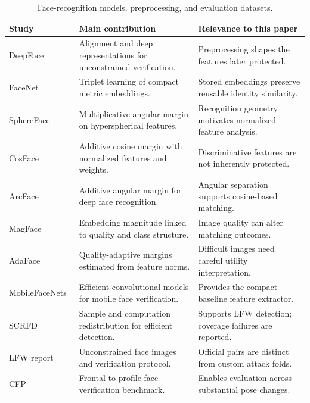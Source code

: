 \begin{table}[t]
\caption{Face-recognition models, preprocessing, and evaluation datasets.}
\label{tab:review1}\centering\footnotesize
\begin{tabularx}{\textwidth}{@{}>{\raggedright\arraybackslash}p{3.1cm}>{\raggedright\arraybackslash}X>{\raggedright\arraybackslash}X@{}}\toprule
Study & Main contribution & Relevance to this paper \\ \midrule
DeepFace~\cite{deepface} & Alignment and deep representations for unconstrained verification. & Preprocessing shapes the features later protected.\\[3pt]
FaceNet~\cite{facenet} & Triplet learning of compact metric embeddings. & Stored embeddings preserve reusable identity similarity.\\[3pt]
SphereFace~\cite{sphereface} & Multiplicative angular margin on hyperspherical features. & Recognition geometry motivates normalized-feature analysis.\\[3pt]
CosFace~\cite{cosface} & Additive cosine margin with normalized features and weights. & Discriminative features are not inherently protected.\\[3pt]
ArcFace~\cite{arcface} & Additive angular margin for deep face recognition. & Angular separation supports cosine-based matching.\\[3pt]
MagFace~\cite{magface} & Embedding magnitude linked to quality and class structure. & Image quality can alter matching outcomes.\\[3pt]
AdaFace~\cite{adaface} & Quality-adaptive margins estimated from feature norms. & Difficult images need careful utility interpretation.\\[3pt]
MobileFaceNets~\cite{chen2018mobilefacenet} & Efficient convolutional models for mobile face verification. & Provides the compact baseline feature extractor.\\[3pt]
SCRFD~\cite{guo2021scrfd} & Sample and computation redistribution for efficient detection. & Supports LFW detection; coverage failures are reported.\\[3pt]
LFW report~\cite{huang2007lfw} & Unconstrained face images and verification protocol. & Official pairs are distinct from custom attack folds.\\[3pt]
CFP~\cite{sengupta2016cfp} & Frontal-to-profile face verification benchmark. & Enables evaluation across substantial pose changes.\\[3pt]
\bottomrule\end{tabularx}
\end{table}

